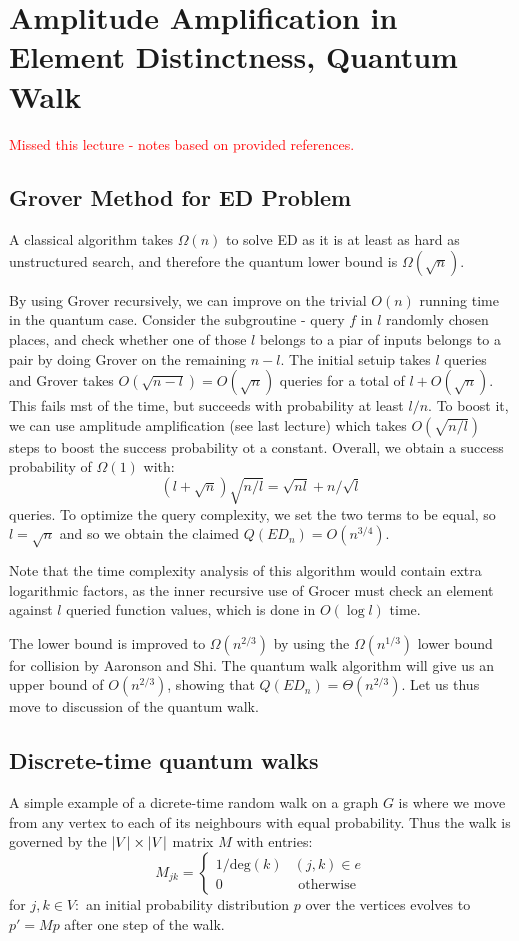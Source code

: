\section{Amplitude Amplification in Element Distinctness, Quantum Walk}
\textcolor{red}{Missed this lecture - notes based on provided references.}

\subsection*{Grover Method for ED Problem}
A classical algorithm takes $\Omega(n)$ to solve ED as it is at least as hard as unstructured search, and therefore the quantum lower bound is $\Omega(\sqrt{n})$. 

By using Grover recursively, we can improve on the trivial $O(n)$ running time in the quantum case. Consider the subgroutine - query $f$ in $l$ randomly chosen places, and check whether one of those $l$ belongs to a piar of inputs belongs to a pair by doing Grover on the remaining $n-l$. The initial setuip takes $l$ queries and Grover takes $O(\sqrt{n-l}) = O(\sqrt{n})$ queries for a total of $l + O(\sqrt{n})$. This fails mst of the time, but succeeds with probability at least $l/n$. To boost it, we can use amplitude amplification (see last lecture) which takes $O(\sqrt{n/l})$ steps to boost the success probability ot a constant. Overall, we obtain a success probability of $\Omega(1)$ with:
\begin{equation}
    (l+\sqrt{n})\sqrt{n/l} = \sqrt{nl} + n/\sqrt{l}
\end{equation}
queries. To optimize the query complexity, we set the two terms to be equal, so $l = \sqrt{n}$ and so we obtain the claimed $Q(ED_n) = O(n^{3/4})$.

Note that the time complexity analysis of this algorithm would contain extra logarithmic factors, as the inner recursive use of Grocer must check an element against $l$ queried function values, which is done in $O(\log l)$ time.

The lower bound is improved to $\Omega(n^{2/3})$ by using the $\Omega(n^{1/3})$ lower bound for collision by Aaronson and Shi. The quantum walk algorithm will give us an upper bound of $O(n^{2/3})$, showing that $Q(ED_n) = \Theta(n^{2/3})$. Let us thus move to discussion of the quantum walk.

\subsection*{Discrete-time quantum walks}
A simple example of a dicrete-time random walk on a graph $G$ is where we move from any vertex to each of its neighbours with equal probability. Thus the walk is governed by the $\lvert V \rvert \times \lvert V \rvert$ matrix $M$ with entries:
\begin{equation}
    M_{jk} = \begin{cases}
        1/\text{deg}(k) & (j, k) \in e
        \\ 0 & \text{ otherwise}
    \end{cases}
\end{equation}
for $j, k \in V:$ an initial probability distribution $p$ over the vertices evolves to $p' = Mp$ after one step of the walk.

